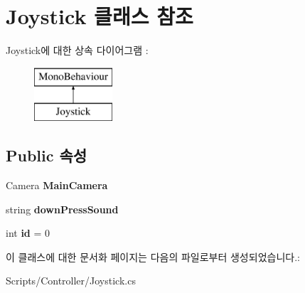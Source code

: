 \hypertarget{class_joystick}{}\section{Joystick 클래스 참조}
\label{class_joystick}
Joystick에 대한 상속 다이어그램 \+: \begin{figure}[H]
\begin{center}
\leavevmode
\includegraphics[height=2.000000cm]{class_joystick}
\end{center}
\end{figure}
\subsection*{Public 속성}
\begin{DoxyCompactItemize}
\item 
\hypertarget{class_joystick_a26ad6d0d6c482b11696e1174a7371632}{}Camera {\bfseries Main\+Camera}\label{class_joystick_a26ad6d0d6c482b11696e1174a7371632}

\item 
\hypertarget{class_joystick_a742a6b74c028bc8f12cda4d71f19ebb4}{}string {\bfseries down\+Press\+Sound}\label{class_joystick_a742a6b74c028bc8f12cda4d71f19ebb4}

\item 
\hypertarget{class_joystick_a394d8dae4d08c353281f6958d870f15f}{}int {\bfseries id} = 0\label{class_joystick_a394d8dae4d08c353281f6958d870f15f}

\end{DoxyCompactItemize}


이 클래스에 대한 문서화 페이지는 다음의 파일로부터 생성되었습니다.\+:\begin{DoxyCompactItemize}
\item 
Scripts/\+Controller/Joystick.\+cs\end{DoxyCompactItemize}

